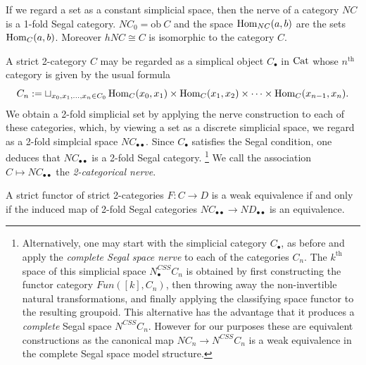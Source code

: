 \documentclass{amsart}
\begin{document}
\begin{example}
	If we regard a set as a constant simplicial space, then the nerve of a category $NC$ is a 1-fold Segal category. $NC_0 = \textrm{ob}\ C$ and the space $\operatorname{Hom}_{NC}(a,b)$ are the sets $\operatorname{Hom}_C(a,b)$. Moreover $hNC \cong C$ is isomorphic to the category $C$. 
\end{example}

\begin{example}
	A strict 2-category $C$ may be regarded as a simplical object $C_\bullet$ in $\mathrm{Cat}$ whose $n^\textrm{th}$ category is given by the usual formula
	\begin{equation*}
		C_n := \sqcup_{x_0, x_1, \dots, x_n \in C_0} \operatorname{Hom}_C(x_0, x_1) \times \operatorname{Hom}_C(x_1, x_2) \times \cdots \times \operatorname{Hom}_C(x_{n-1}, x_n).
	\end{equation*}
	We obtain a 2-fold simplicial set by applying the nerve construction to each of these categories, which, by viewing a set as a discrete simplicial space, we regard as a 2-fold simplcial space $NC_{\bullet \bullet}$. Since $C_\bullet$ satisfies the Segal condition, one deduces that $NC_{\bullet \bullet}$ is a 2-fold Segal category. 
	\footnote{Alternatively, one may start with the simplicial category $C_\bullet$, as before and apply the {\em complete Segal space nerve} to each of the categories $C_n$. The $k^\text{th}$ space of this simplicial space $N^{CSS}_\bullet C_n$ is obtained by first constructing the functor category $Fun([k], C_n)$, then throwing away the non-invertible natural transformations, and finally applying the classifying space functor to the resulting groupoid. This alternative has the advantage that it produces a {\em complete} Segal space $N^{CSS} C_n$. However for our purposes these are equivalent constructions as the canonical map $N C_n \to N^{CSS} C_n$ is a weak equivalence in the complete Segal space model structure. 
	} We call the association $C \mapsto NC_{\bullet \bullet}$ the {\em 2-categorical nerve}. 
\end{example}

\begin{lemma} \label{lma:2catnervereflectsequiv}
	A strict functor of strict 2-categories $F: C \to D$ is a weak equivalence if and only if the induced map of 2-fold Segal categories $NC_{\bullet \bullet} \to ND_{\bullet \bullet}$ is an equivalence. 
\end{lemma}
\end{document}

